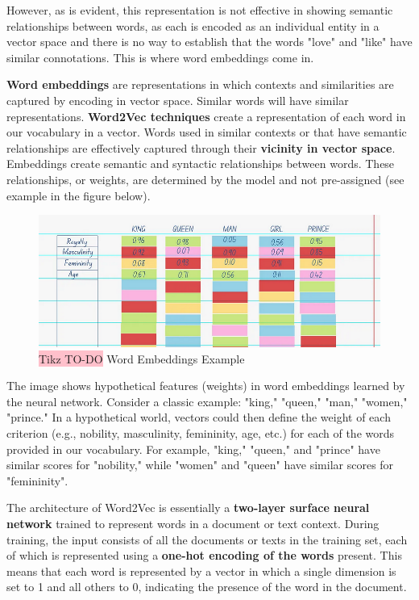 However, as is evident, this representation is not effective in showing semantic relationships between words, as each is encoded as an individual entity in a vector space and there is no way to establish that the words "love" and "like" have similar connotations. This is where word embeddings come in.

\textbf{Word embeddings} are representations in which contexts and similarities are captured by encoding in vector space. Similar words will have similar representations. \textbf{Word2Vec techniques} create a representation of each word in our vocabulary in a vector. Words used in similar contexts or that have semantic relationships are effectively captured through their \textbf{vicinity in vector space}. Embeddings create semantic and syntactic relationships between words. These relationships, or weights, are determined by the model and not pre-assigned (see example in the figure below).

\begin{figure}[!htbp]
        \centering
        \includegraphics[width=0.8\linewidth]{tikz/chapter7 - Word2Vec Example.png}
        \caption{{\color{red}\colorbox{pink}{Tikz TO-DO}} Word Embeddings Example}
\end{figure}

The image shows hypothetical features (weights) in word embeddings learned by the neural network. Consider a classic example: "king," "queen," "man," "women," "prince." In a hypothetical world, vectors could then define the weight of each criterion (e.g., nobility, masculinity, femininity, age, etc.) for each of the words provided in our vocabulary. For example, "king," "queen," and "prince" have similar scores for "nobility," while "women" and "queen" have similar scores for "femininity".

The architecture of Word2Vec is essentially a \textbf{two-layer surface neural network} trained to represent words in a document or text context. During training, the input consists of all the documents or texts in the training set, each of which is represented using a \textbf{one-hot encoding of the words} present. This means that each word is represented by a vector in which a single dimension is set to 1 and all others to 0, indicating the presence of the word in the document.

